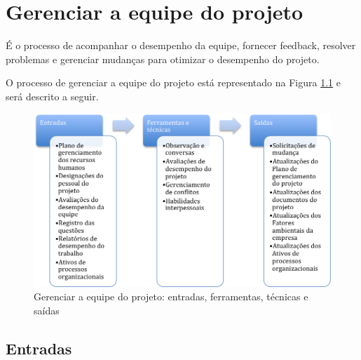 \chapter{Gerenciar a equipe do projeto}

É o processo de acompanhar o desempenho da equipe, fornecer feedback, resolver problemas e gerenciar mudanças para otimizar o desempenho do projeto.

O processo de gerenciar a equipe do projeto está representado na Figura \ref{fig:rh:ger:efts} e será descrito a seguir.

\begin{figure}[!h]
	\centering
	\includegraphics[scale=0.5]{Figuras/rh_efts_gerenciar.png}
	\caption{Gerenciar a equipe do projeto: entradas, ferramentas, técnicas e saídas}
	\label{fig:rh:ger:efts}
\end{figure}

\section{Entradas}

